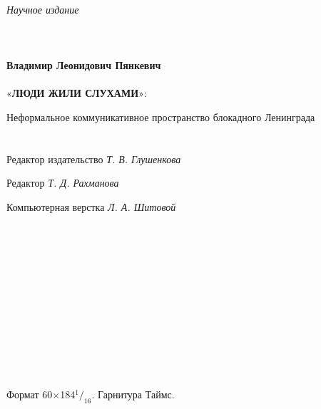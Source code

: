 \documentclass[12pt, a4paper, openany]{book}
\newcommand*\rfrac[2]{{}^{#1}\!/_{#2}}
\begin{document}
\begin{center}
	\ \\
	\ \\
	\ \\
	\ \\
	\ \\
	\ \\

	\ \\
	\ \\
	\ \\
	\ \\
	\ \\
	\ \\
	\ \\
	\ \\
	\ \\
\textit{Научное издание}
	\ \\
	\ \\
	\ \\
	\ \\
	\textbf{Владимир Леонидович Пянкевич}
	\ \\
	\ \\
«\textbf{ЛЮДИ ЖИЛИ СЛУХАМИ}»:

Неформальное коммуникативное пространство блокадного Ленинграда
	\ \\
	\ \\
	\ \\		
	Редактор издательство \textit{Т. В. Глушенкова}
	
	Редактор \textit{Т. Д. Рахманова}
	
	Компьютерная верстка \textit{Л. А. Шитовой}
	
	\ \\
	\ \\
	
	\ \\	

	\ \\
\ \\

\ \\
	\ \\	

\ \\
\ \\

\ \\		
	
		\ \\	
	
{\footnotesize 	 
	
	Формат 60$\times$184$\rfrac{1}{16}$. Гарнитура Таймс.
	
}
\end{center}
\end{document}
